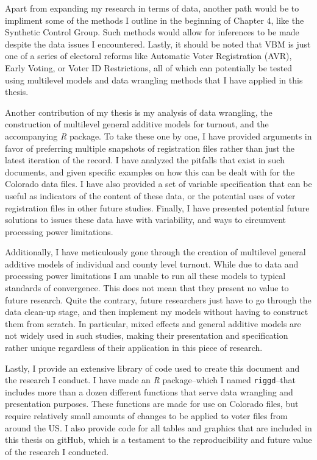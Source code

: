 \documentclass[12pt,twoside]{reedthesis}
\begin{document}
  Apart from expanding my research in terms of data, another path would be
  to impliment some of the methods I outline in the beginning of Chapter
  4, like the Synthetic Control Group. Such methods would allow for
  inferences to be made despite the data issues I encountered. Lastly, it
  should be noted that VBM is just one of a series of electoral reforms
  like Automatic Voter Registration (AVR), Early Voting, or Voter ID
  Restrictions, all of which can potentially be tested using multilevel
  models and data wrangling methods that I have applied in this thesis.
  
  Another contribution of my thesis is my analysis of data wrangling, the
  construction of multilevel general additive models for turnout, and the
  accompanying \textit{R} package. To take these one by one, I have
  provided arguments in favor of preferring multiple snapshots of
  registration files rather than just the latest iteration of the record.
  I have analyzed the pitfalls that exist in such documents, and given
  specific examples on how this can be dealt with for the Colorado data
  files. I have also provided a set of variable specification that can be
  useful as indicators of the content of these data, or the potential uses
  of voter registration files in other future studies. Finally, I have
  presented potential future solutions to issues these data have with
  variability, and ways to circumvent processing power limitations.
  
  Additionally, I have meticulously gone through the creation of
  multilevel general additive models of individual and county level
  turnout. While due to data and processing power limitations I am unable
  to run all these models to typical standards of convergence. This does
  not mean that they present no value to future research. Quite the
  contrary, future researchers just have to go through the data clean-up
  stage, and then implement my models without having to construct them
  from scratch. In particular, mixed effects and general additive models
  are not widely used in such studies, making their presentation and
  specification rather unique regardless of their application in this
  piece of research.
  
  Lastly, I provide an extensive library of code used to create this
  document and the research I conduct. I have made an \textit{R}
  package--which I named \texttt{riggd}--that includes more than a dozen
  different functions that serve data wrangling and presentation purposes.
  These functions are made for use on Colorado files, but require
  relatively small amounts of changes to be applied to voter files from
  around the US. I also provide code for all tables and graphics that are
  included in this thesis on gitHub, which is a testament to the
  reproducibility and future value of the research I conducted.
  
\end{document}
